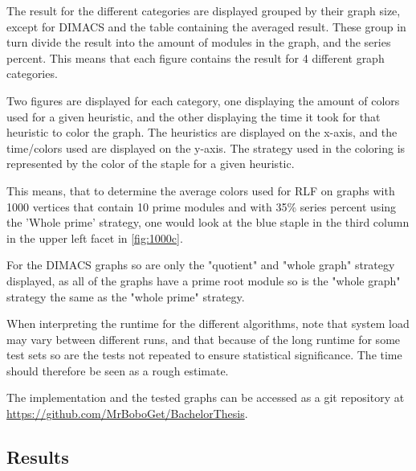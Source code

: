 \documentclass[a4paper]{article}
\begin{document}
The result for the different categories are displayed grouped by their graph size,
except for DIMACS and the table containing the averaged result. These group in turn 
divide the result into the amount of modules in the graph, and the series percent. This means that
each figure contains the result for 4 different graph categories.

Two figures are displayed for each category, one displaying the amount of
colors used for a given heuristic, and the other displaying the time it took
for that heuristic to color the graph. The heuristics are displayed on the
x-axis, and the time/colors used are displayed on the y-axis. The strategy used in 
the coloring is represented by the color of the staple for a given heuristic.

This means, that to determine the average colors used for RLF on graphs with
1000 vertices that contain 10 prime modules and with 35\% series percent using
the 'Whole prime' strategy, one would look at the blue staple in the third
column in the upper left facet in \autoref{fig:1000c}.

For the DIMACS graphs so are only the "quotient" and "whole graph" strategy displayed,
as all of the graphs have a prime root module so is the "whole graph" strategy
the same as the "whole prime" strategy.

When interpreting the runtime for the different algorithms, note
that system load may vary between different runs, and that because of
the long runtime for some test sets so are the tests not repeated to ensure
statistical significance. The time should therefore be seen as a rough
estimate.

The implementation and the tested graphs can be accessed as a git repository 
at \url{https://github.com/MrBoboGet/BachelorThesis}.

\subsection{Results}
\newpage
\end{document}
